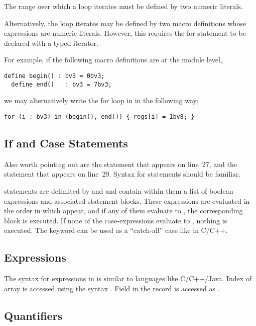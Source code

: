 The range over which a  loop iterates must be defined by two numeric literals.

Alternatively, the loop iterates may be defined by two macro definitions whose expressions are numeric literals. However, this requires the for statement to be declared with a typed iterator.

For example, if the following macro definitions are at the module level,
\begin{lstlisting}[language=uclid,style=uclidstyle]
  define begin() : bv3 = 0bv3;
  define end()   : bv3 = 7bv3;
\end{lstlisting}
we may alternatively write the for loop in  in the following way:
\begin{lstlisting}[language=uclid,style=uclidstyle]
  for (i : bv3) in (begin(), end()) { regs[i] = 1bv8; }
\end{lstlisting}

\subsection{If and Case Statements}
Also worth pointing out are the  statement that appears on line~27, and the  statement that appears on line~29. Syntax for  statements should be familiar.

 statements are delimited by  and  and contain within them a list of boolean expressions and associated statement blocks. These expressions are evaluated in the order in which appear, and if any of them evaluate to , the corresponding block is executed. If none of the case-expressions evaluate to , nothing is executed. The keyword  can be used as a ``catch-all'' case like in C/C++.

\subsection{Expressions}

The syntax for expressions in \uclid{} is similar to languages like C/C++/Java. Index  of array  is accessed using the syntax . Field  in the record  is accessed as .

\subsection{Quantifiers}


